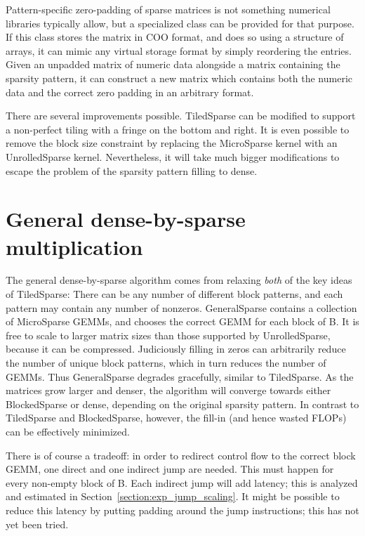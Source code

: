 Pattern-specific zero-padding of sparse matrices is not something numerical libraries typically allow, but a specialized class can be provided for that purpose. If this class stores the matrix in COO format, and does so using a structure of arrays, it can mimic any virtual storage format by simply reordering the entries. Given an unpadded matrix of numeric data alongside a matrix containing the sparsity pattern, it can construct a new matrix which contains both the numeric data and the correct zero padding in an arbitrary format. 

There are several improvements possible. TiledSparse can be modified to support a non-perfect tiling with a fringe on the bottom and right. It is even possible to remove the block size constraint by replacing the MicroSparse kernel with an UnrolledSparse kernel. Nevertheless, it will take much bigger modifications to escape the problem of the sparsity pattern filling to dense.




\section{General dense-by-sparse multiplication}

The general dense-by-sparse algorithm comes from relaxing \emph{both} of the key ideas of TiledSparse: There can be any number of different block patterns, and each pattern may contain any number of nonzeros. GeneralSparse contains a collection of MicroSparse GEMMs, and chooses the correct GEMM for each block of B. It is free to scale to larger matrix sizes than those supported by UnrolledSparse, because it can be compressed. Judiciously filling in zeros can arbitrarily reduce the number of unique block patterns, which in turn reduces the number of GEMMs. Thus GeneralSparse degrades gracefully, similar to TiledSparse. As the matrices grow larger and denser, the algorithm will converge towards either BlockedSparse or dense, depending on the original sparsity pattern. In contrast to TiledSparse and BlockedSparse, however, the fill-in (and hence wasted FLOPs) can be effectively minimized.

There is of course a tradeoff: in order to redirect control flow to the correct block GEMM, one direct and one indirect jump are needed. This must happen for every non-empty block of B. Each indirect jump will add latency; this is analyzed and estimated in Section~\ref{section:exp_jump_scaling}. It might be possible to reduce this latency by putting padding around the jump instructions; this has not yet been tried.

